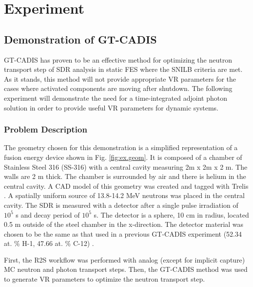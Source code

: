 \graphicspath{{/home/chelsea/prelim/src/figs}}

\chapter{Experiment} \label{ch:exp}

\section{Demonstration of GT-CADIS} \label{sec:gtcadis}
GT-CADIS has proven to be an effective method 
for optimizing the neutron transport step of 
SDR analysis in static FES where the SNILB criteria are met.  As it stands, this method
will not provide appropriate VR parameters for the cases where activated
components are moving
after shutdown.  The following experiment will demonstrate the need for a
time-integrated adjoint photon solution in order to provide useful VR parameters for
dynamic systems.

\subsection{Problem Description} \label{sec:description}
The geometry chosen for this demonstration is a simplified representation of a 
fusion energy device shown in Fig. \ref{fig:ex.geom}.
It is composed of a chamber of Stainless Steel 316 (SS-316) with a central cavity measuring
2m x 2m x 2 m.  The walls are 2 m thick.  The chamber is surrounded by air and
there is helium in the central cavity.  A CAD model of this geometry was created and tagged
with Trelis \cite{trelis}.  A spatially uniform source of
13.8-14.2 MeV neutrons was placed in the central cavity. 
The SDR is measured with a detector after a single pulse irradiation of $10^5$ s and
decay period of $10^5$ s.  The detector is a sphere, 10 cm in radius, located 0.5
m outside of the steel chamber in the x-direction. The detector material was chosen to
be the same as that used in a previous GT-CADIS experiment (52.34 at. \% H-1,
47.66 at. \% C-12) \cite{gtcadis}.  

First, the R2S workflow was performed with analog (except for implicit capture)
MC neutron and photon transport steps.
Then, the GT-CADIS method was used to generate VR parameters
to optimize the neutron transport step.


